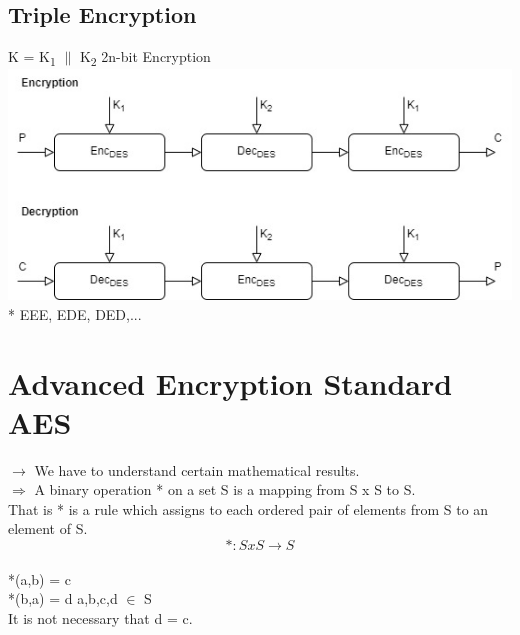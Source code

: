 \documentclass[11pt]{article}
\begin{document}
	\subsection{Triple Encryption}
	K = K\textsubscript{1} $\|$ K\textsubscript{2} \hfill 2n-bit Encryption \vspace{0.4cm}\\
	\centering\includegraphics[width=16cm]{Triple Enc.jpg}\flushleft
	\mbox{*} EEE, EDE, DED,...\\
	\section{Advanced Encryption Standard AES}
	$\rightarrow$ We have to understand certain mathematical results.\\
	\mbox{$\Rightarrow$} A binary operation * on a set S is a mapping from S x S to S.\\
	That is * is a rule which assigns to each ordered pair of elements from S to an element of S.$$* : S x S \rightarrow S$$\\
	*(a,b) = c\\
	*(b,a) = d \hspace{1cm} a,b,c,d $\in$ S\\
	It is not necessary that d = c.\\
\end{document}
